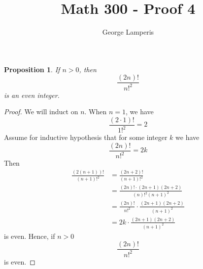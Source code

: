 \documentclass[12pt]{article}
\title{Math 300 - Proof 4}
\author{George Lamperis}
\date{}
\theoremstyle{mystyle}
\newtheorem{prop}[thm]{Proposition}
\begin{document}
\maketitle

\begin{prop}
  If $n > 0$, then 
  $$
    \frac{(2n)!}{n!^2}
  $$
  is an even integer.
\end{prop}
\begin{proof}
We will induct on $n$. When $n=1$, we have
$$
  \frac{(2 \cdot 1)!}{1!^2} = 2
$$
Assume for inductive hypothesis that for some integer $k$ we have
$$ 
  \frac{(2n)!}{n!^2} = 2k
$$
Then
\begin{align*}
  \frac{(2(n+1))!}{(n+1)!^2}
    &= \frac{(2n+2)!}{(n+1)!^2} \\
    &= \frac{(2n)! \cdot (2n+1)(2n+2)}{(n)!^2 (n+1)^2} \\
    &= \frac{(2n)!}{n!^2} \cdot \frac{(2n+1)(2n+2)}{(n+1)^2} \\
    &= 2k \cdot \frac{(2n+1)(2n+2)}{(n+1)^2}
\end{align*}
is even. Hence, if $n > 0$
$$
  \frac{(2n)!}{n!^2}
$$
is even.
\end{proof}
\end{document}
